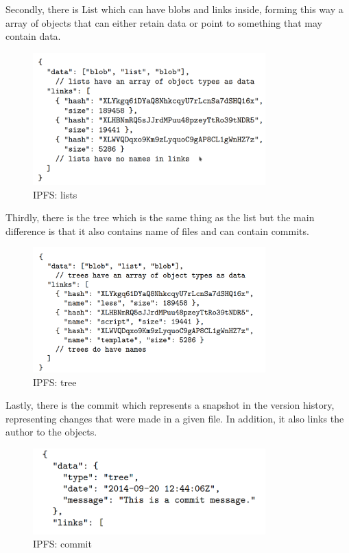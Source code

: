 Secondly, there is List which can have blobs and links inside, forming this way a array of objects that can either retain data or point to something that may contain data.

\begin{figure}[H]
    \centering
    \includegraphics[width=0.8\textwidth]{assets/use-case-1/List.png} %
    \caption{IPFS: lists}
    \label{fig:sample-image} 
\end{figure}


Thirdly, there is the tree which is the same thing as the list but the main difference is that it also contains name of files and can contain commits.

\begin{figure}[H]
    \centering
    \includegraphics[width=0.8\textwidth]{assets/use-case-1/Trees.png} %
    \caption{IPFS: tree}
    \label{fig:sample-image} 
\end{figure}


Lastly, there is the commit which represents a snapshot in the version history, representing changes that were made in a given file. In addition, it also links the author to the objects.

\begin{figure}[H]
    \centering
    \includegraphics[width=0.8\textwidth]{assets/use-case-1/commit.png} %
    \caption{IPFS: commit}
    \label{fig:sample-image} 
\end{figure}


